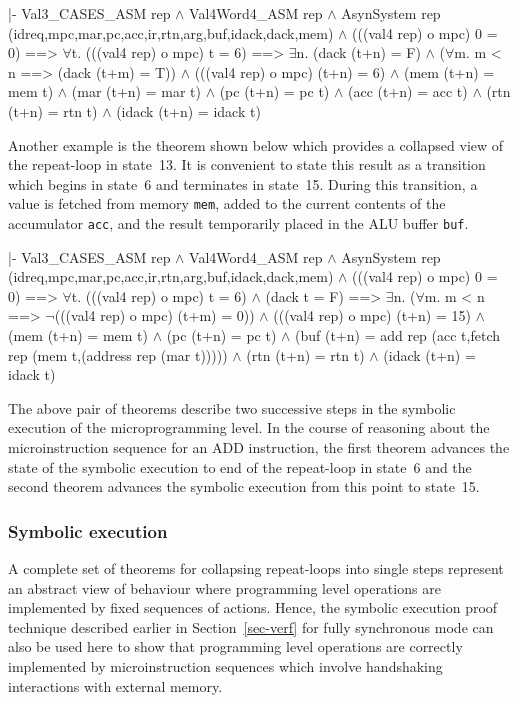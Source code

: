 \begintt
|- Val3_CASES_ASM rep \(\wedge\)
   Val4Word4_ASM rep \(\wedge\)
   AsynSystem rep (idreq,mpc,mar,pc,acc,ir,rtn,arg,buf,idack,dack,mem) \(\wedge\)
   (((val4 rep) o mpc) 0 = 0)
   ==>
   \(\forall\)t.
     (((val4 rep) o mpc) t = 6)
     ==>
     \(\exists\)n.
       (dack (t+n) = F) \(\wedge\)
       (\(\forall\)m. m < n ==> (dack (t+m) = T)) \(\wedge\)
       (((val4 rep) o mpc) (t+n) = 6) \(\wedge\)
       (mem (t+n) = mem t) \(\wedge\)
       (mar (t+n) = mar t) \(\wedge\)
       (pc (t+n) = pc t) \(\wedge\)
       (acc (t+n) = acc t) \(\wedge\)
       (rtn (t+n) = rtn t) \(\wedge\)
       (idack (t+n) = idack t)
\endtt

Another example is the theorem shown below which provides a collapsed
view of the repeat-loop in state~13.
It is convenient to state this result as a transition which begins
in state~6 and terminates in state~15.
During this transition, a value is fetched from memory \verb"mem",
added to the current contents of the accumulator \verb"acc", and the result
temporarily placed in the ALU buffer \verb"buf".

\begintt
|- Val3_CASES_ASM rep \(\wedge\)
   Val4Word4_ASM rep \(\wedge\)
   AsynSystem rep (idreq,mpc,mar,pc,acc,ir,rtn,arg,buf,idack,dack,mem) \(\wedge\)
   (((val4 rep) o mpc) 0 = 0)
   ==>
   \(\forall\)t.
     (((val4 rep) o mpc) t = 6) \(\wedge\)
     (dack t = F)
     ==>
     \(\exists\)n.
       (\(\forall\)m. m < n ==> \(\neg\)(((val4 rep) o mpc) (t+m) = 0)) \(\wedge\)
       (((val4 rep) o mpc) (t+n) = 15) \(\wedge\)
       (mem (t+n) = mem t) \(\wedge\)
       (pc (t+n) = pc t) \(\wedge\)
       (buf (t+n) =
         add rep (acc t,fetch rep (mem t,(address rep (mar t))))) \(\wedge\)
       (rtn (t+n) = rtn t) \(\wedge\)
       (idack (t+n) = idack t)
\endtt

The above pair of theorems describe two successive steps in the
symbolic execution of the microprogramming level.
In the course of reasoning about the microinstruction sequence
for an ADD instruction,
the first theorem advances the state of the symbolic execution
to end of the repeat-loop in state~6 and the second theorem
advances the symbolic execution from this point to state~15.

\subsubsection{Symbolic execution}

A complete set of theorems for collapsing
repeat-loops into single steps represent
an abstract view of behaviour where programming level
operations are implemented by fixed sequences of actions.
Hence, the symbolic execution proof technique described earlier
in Section~\ref{sec-verf}
for fully synchronous mode can also be used here
to show that programming level operations are correctly implemented
by microinstruction sequences which involve handshaking interactions
with external memory.

